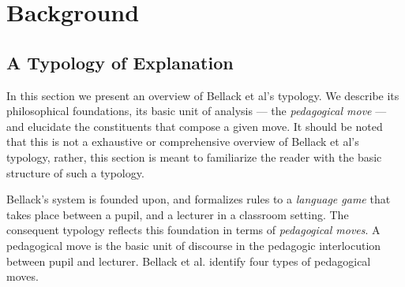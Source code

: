 \documentclass[conference]{IEEEtran}
\begin{document}
\section{Background}
\subsection{A Typology of Explanation}
In this section we present an overview of Bellack et al's typology. We describe
its philosophical foundations, its basic unit of analysis --- the
\emph{pedagogical move} --- and elucidate the constituents that compose a given
move. It should be noted that this is not a exhaustive or comprehensive overview
of Bellack et al's typology, rather, this section is meant to familiarize the
reader with the basic structure of such a typology.

Bellack's system is founded upon, and formalizes rules to a \emph{language
  game}\cite{wittgenstein2010philosophical} that takes place between a pupil,
and a lecturer in a classroom setting. The consequent typology reflects this
foundation in terms of \emph{pedagogical moves}. A pedagogical move is the basic
unit of discourse in the pedagogic interlocution between pupil and lecturer.
Bellack et al. identify four types of pedagogical moves.
%
\end{document}
